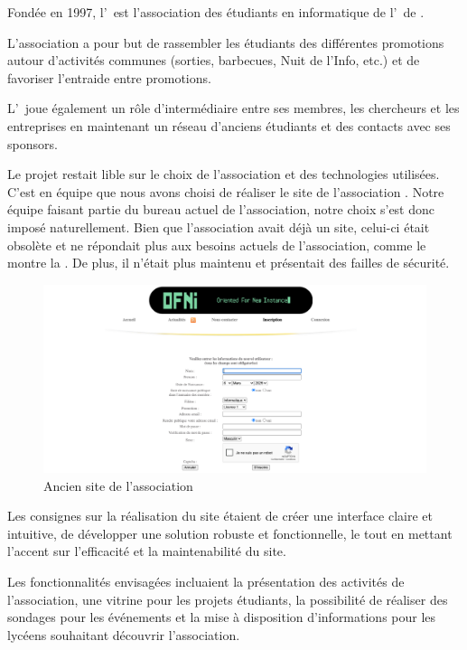 Fondée en 1997, l'\ofni\ est l'association des étudiants en informatique de l'\univ\ de .
\bigskip

L'association a pour but de rassembler les étudiants des différentes promotions autour d'activités communes (sorties, barbecues, Nuit de l'Info, etc.) et de favoriser l'entraide entre promotions.

L'\ofni\ joue également un rôle d’intermédiaire entre ses membres, les chercheurs et les entreprises en maintenant un réseau d’anciens étudiants et des contacts avec ses sponsors.
\bigskip

Le projet restait lible sur le choix de l'association et des technologies utilisées.
C'est en équipe que nous avons choisi de réaliser le site de l'association \ofni{}. 
Notre équipe faisant partie du bureau actuel de l'association, notre choix s'est donc imposé naturellement. 
Bien que l'association avait déjà un site, celui-ci était obsolète et ne répondait plus aux besoins actuels de l'association, comme le montre la .
De plus, il n'était plus maintenu et présentait des failles de sécurité.
\bigskip

\begin{figure}[!ht]
    \centering%
    \includegraphics[width=15cm]{assets/pictures/old-site.png}
    \caption[\emph{Ancien site de l'association \ofni}]{Ancien site de l'association \ofni}%
    \label{oldsite}%
\end{figure}
\bigskip

Les consignes sur la réalisation du site étaient de créer une interface claire et intuitive, de développer une solution robuste et fonctionnelle, le tout en mettant l’accent sur l’efficacité et la maintenabilité du site.
\bigskip

Les fonctionnalités envisagées incluaient la présentation des activités de l’association, une vitrine pour les projets étudiants, la possibilité de réaliser des sondages pour les événements et la mise à disposition d’informations pour les lycéens souhaitant découvrir l’association.
